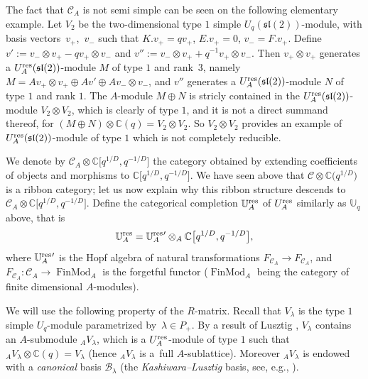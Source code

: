 \documentclass[pdftex]{sigma}%
\numberwithin{equation}{section}
\numberwithin{figure}{section}
\newcommand{\mUq}{\mathbb{U}_q}
\newcommand{\mc}{\mathbb{C}}
\begin{document}
\begin{remk}{\rm The fact that ${\mathcal C}_A$ is not semi simple can be seen on the following elementary example. Let $V_2$ be the two-dimensional type $1$ simple $U_q({\mathfrak{sl}}(2))$-module, with basis vectors~$v_+$,~$v_-$ such that $K.v_+ = qv_+$, $E.v_+=0$, $v_- = F.v_+$. Define $v' := v_-\otimes v_+ - qv_+\otimes v_-$ and $v'' := v_-\otimes v_+ + q^{-1}v_+\otimes v_-$. Then $v_+\otimes v_+$ generates a $U_A^{\rm res}({\mathfrak{sl}}(2))$-module $M$ of type $1$ and rank~$3$, namely $M=A v_+\otimes v_+ \oplus A v' \oplus Av_-\otimes v_-$, and $v''$ generates a $U_A^{\rm res}({\mathfrak{sl}}(2))$-module $N$ of type $1$ and rank $1$. The $A$-module $M\oplus N$ is stricly contained in the $U_A^{\rm res}({\mathfrak{sl}}(2))$-module $V_2 \otimes V_2$, which is clearly of type $1$, and it is not a direct summand thereof, for $(M\oplus N)\otimes \mc(q) = V_2 \otimes V_2$. So $V_2 \otimes V_2$ provides an example of $U_A^{\rm res}({\mathfrak{sl}}(2))$-module of type $1$ which is not completely reducible.}
\end{remk}

We denote by ${\mathcal C}_A \otimes \mc\big[q^{1/D},q^{-1/D}\big]$ the category obtained by extending coefficients of objects and morphisms to $\mc\big[q^{1/D},q^{-1/D}\big]$. We have seen above that ${\mathcal C} \otimes \mc\big(q^{1/D}\big)$ is a ribbon category; let us now explain why this ribbon structure descends to ${\mathcal C}_A\otimes {\mathbb C}\big[q^{1/D},q^{-1/D}\big]$. Define the categorical completion $\mathbb{U}_A^{\rm res}$ of $U_A^{\rm res}$ similarly as $\mUq$ above, that is
\[\mathbb{U}_A^{\rm res} = \mathbb{U}_A^{\rm res}{}' \otimes_A {\mathbb C}\big[q^{1/D},q^{-1/D}\big],\]
where $\mathbb{U}_A^{\rm res}{}'$ is the Hopf algebra of natural transformations $F_{\mathcal C_A}\to F_{\mathcal C_A}$, and $F_{\mathcal C_A}\colon {\mathcal C_A}\to \operatorname{FinMod}_A$ is the forgetful functor ($\operatorname{FinMod}_A$ being the category of finite dimensional $A$-modules).

We will use the following property of the $R$-matrix. Recall that $V_\lambda$ is the type $1$ simple $U_q$-module parametrized by~$\lambda\in P_+$. By a result of Lusztig \cite[Proposition~4.2]{Lusztig1}, $V_\lambda$ contains an $A$-submodule ${}_AV_\lambda$, which is a $U_A^{\rm res}$-module of type $1$ such that ${}_AV_\lambda\otimes \mc(q) = V_\lambda$ (hence ${}_AV_\lambda$ is a~full $A$-sublattice). Moreover ${}_AV_\lambda$ is endowed with a {\it canonical} basis $\mathcal{B}_\lambda$ (the {\it Kashiwara--Lusztig} basis, see, e.g., \cite[Chapter~14]{CP}).
\end{document}
